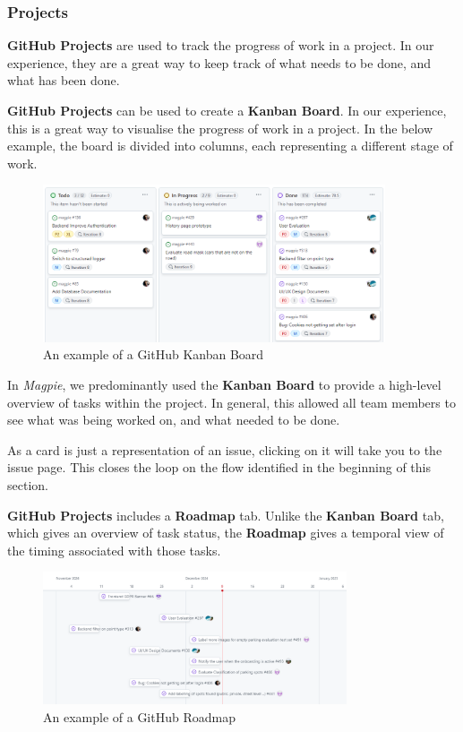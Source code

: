 \newpage{}

\subsubsection{Projects}
\textbf{GitHub Projects} are used to track the progress of work in a project. In
our experience, they are a great way to keep track of what needs to be done, and
what has been done.

\textbf{GitHub Projects} can be used to create a \textbf{Kanban Board}. In our
experience, this is a great way to visualise the progress of work in a project.
In the below example, the board is divided into columns, each representing a
different stage of work.

\begin{figure}[htbp]
    \centering{}
    \includegraphics[width=0.9\textwidth]{images/github_kanban.png}
    \caption{An example of a GitHub Kanban Board}
\end{figure}

In \textit{Magpie}, we predominantly used the \textbf{Kanban Board} to provide a
high-level overview of tasks within the project. In general, this allowed all
team members to see what was being worked on, and what needed to be done.

As a card is just a representation of an issue, clicking on it will take you to
the issue page. This closes the loop on the flow identified in the beginning of
this section.

\textbf{GitHub Projects} includes a \textbf{Roadmap} tab. Unlike the
\textbf{Kanban Board} tab, which gives an overview of task status, the
\textbf{Roadmap} gives a temporal view of the timing associated with those
tasks.

\begin{figure}[h]
    \centering{}
    \includegraphics[width=0.8\textwidth]{images/github_roadmap.png}
    \caption{An example of a GitHub Roadmap}
\end{figure}

